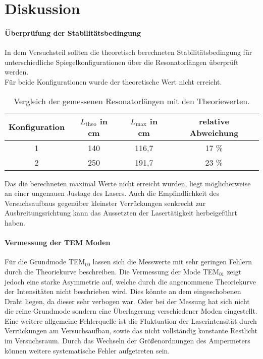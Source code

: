 \section{Diskussion}
\label{sec:Diskussion}
\paragraph{Überprüfung der Stabilitätsbedingung}
In dem Versuchsteil sollten die theoretisch berechneten
Stabilitätsbedingung für unterschiedliche Spiegelkonfigurationen über die
Resonatorlängen überprüft werden.\\
Für beide Konfigurationen wurde der theoretische Wert nicht erreicht.
\begin{table}
  \centering
  \caption{Vergleich der gemessenen Resonatorlängen mit den Theoriewerten.}
  \label{tab:DisRe}
  \begin{tabular}{c|c | c | c}
      \toprule
      Konfiguration & $L_{\text{theo}}$ in cm & $L_{\text{max}}$ in cm  & relative Abweichung\\
      \midrule
      1 & 140 & 116,7 &  17 \% \\
      2 & 250 & 191,7 & 23 \%\\
      \bottomrule
  \end{tabular}
\end{table}
Das die berechneten maximal Werte nicht erreicht wurden, liegt möglicherweise an
einer ungenauen Justage des Lasers. Auch die Empfindlichkeit des
Versuchsaufbaus gegenüber kleinster Verrückungen senkrecht zur Ausbreitungsrichtung
kann das Aussetzten der Lasertätigkeit herbeigeführt haben.
\paragraph{Vermessung der TEM Moden}
Für die Grundmode TEM$_{00}$ lassen sich die Messwerte mit sehr geringen Fehlern
durch  die Theoriekurve beschreiben. Die Vermessung der Mode TEM$_{01}$ zeigt
jedoch eine starke Asymmetrie auf, welche
durch die angenommene Theoriekurve der Intensitäten nicht beschrieben wird.
Dies könnte an dem eingeschobenen Draht liegen, da dieser sehr verbogen war.
Oder bei der Messung hat sich nicht die reine Grundmode sondern eine
Überlagerung verschiedener Moden eingestellt. Eine
weitere allgemeine Fehlerquelle ist die Fluktuation der Laserintensität
durch Verrückungen am Versuchsaufbau, sowie das nicht vollständig
konstante Restlicht im Versuchsraum. Durch das Wechseln der Größenordnungen des
Ampermeters können weitere systematische Fehler aufgetreten sein.
